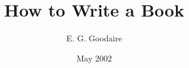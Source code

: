 \documentclass[12pt,a4paper]{ctexbook}
\begin{document}
 

\author{E. G. Goodaire} 
\title{How to Write a Book} 
\date{May 2002} 

\frontmatter 
\tableofcontents 
 

\mainmatter 
 
 


\appendix
\backmatter 
 
\printindex %
\end{document}
